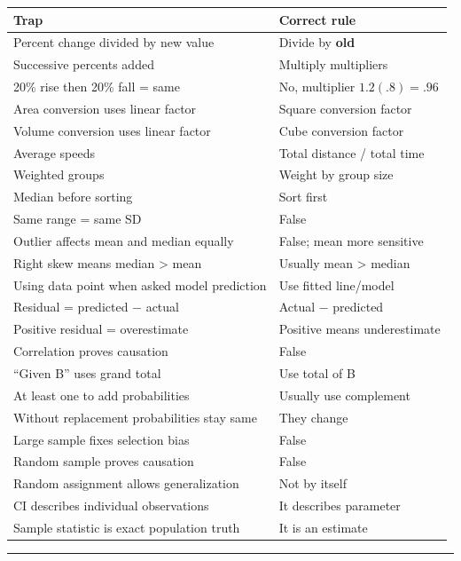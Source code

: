 \documentclass[
]{article}
\newcounter{none} %
\begin{document}
{\def\LTcaptype{none} %
\begin{longtable}[]{@{}ll@{}}
\toprule\noalign{}
Trap & Correct rule \\
\midrule\noalign{}
\endhead
\bottomrule\noalign{}
\endlastfoot
Percent change divided by new value & Divide by \textbf{old} \\
Successive percents added & Multiply multipliers \\
20\% rise then 20\% fall = same & No, multiplier \(1.2(.8)=.96\) \\
Area conversion uses linear factor & Square conversion factor \\
Volume conversion uses linear factor & Cube conversion factor \\
Average speeds & Total distance / total time \\
Weighted groups & Weight by group size \\
Median before sorting & Sort first \\
Same range = same SD & False \\
Outlier affects mean and median equally & False; mean more sensitive \\
Right skew means median \textgreater{} mean & Usually mean
\textgreater{} median \\
Using data point when asked model prediction & Use fitted line/model \\
Residual = predicted − actual & Actual − predicted \\
Positive residual = overestimate & Positive means underestimate \\
Correlation proves causation & False \\
``Given B'' uses grand total & Use total of B \\
At least one to add probabilities & Usually use complement \\
Without replacement probabilities stay same & They change \\
Large sample fixes selection bias & False \\
Random sample proves causation & False \\
Random assignment allows generalization & Not by itself \\
CI describes individual observations & It describes parameter \\
Sample statistic is exact population truth & It is an estimate \\
\end{longtable}
}

\begin{center}\rule{0.5\linewidth}{0.5pt}\end{center}
\end{document}
